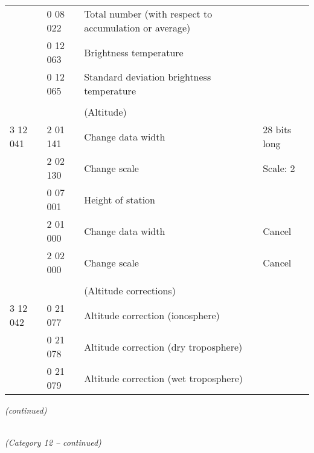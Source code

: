 \begin{longtable}[]{@{}llll@{}}
& 0 08 022 & Total number (with respect to accumulation or average) &\tabularnewline
& 0 12 063 & Brightness temperature &\tabularnewline
& 0 12 065 & Standard deviation brightness temperature &\tabularnewline
& & &\tabularnewline
& & (Altitude) &\tabularnewline
3 12 041 & 2 01 141 & Change data width & 28 bits long\tabularnewline
& 2 02 130 & Change scale & Scale: 2\tabularnewline
& 0 07 001 & Height of station &\tabularnewline
& 2 01 000 & Change data width & Cancel\tabularnewline
& 2 02 000 & Change scale & Cancel\tabularnewline
& & &\tabularnewline
& & (Altitude corrections) &\tabularnewline
3 12 042 & 0 21 077 & Altitude correction (ionosphere) &\tabularnewline
& 0 21 078 & Altitude correction (dry troposphere) &\tabularnewline
& 0 21 079 & Altitude correction (wet troposphere) &\tabularnewline
\bottomrule
\end{longtable}

\emph{(continued)}

\emph{\\
(Category 12 -- continued)}

